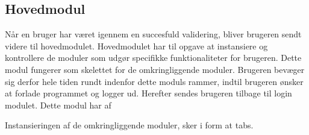 \subsection{Hovedmodul}
\label{sub:hovedmodul}

Når en bruger har været igennem en succesfuld validering, bliver brugeren sendt videre til hovedmodulet. Hovedmodulet har til opgave at instansiere og kontrollere de moduler som udgør specifikke funktionaliteter for brugeren. Dette modul fungerer som skelettet for de omkringliggende moduler. Brugeren bevæger sig derfor hele tiden rundt indenfor dette moduls rammer, indtil brugeren ønsker at forlade programmet og logger ud. Herefter sendes brugeren tilbage til login modulet. Dette modul har af 

Instansieringen af de omkringliggende moduler, sker i form at tabs. 

